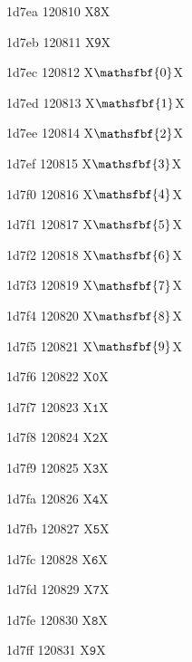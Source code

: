 \documentclass[11pt]{article}
\begin{document}
1d7ea 120810 X{\ensuremath{\mathsf{8}}}X

1d7eb 120811 X{\ensuremath{\mathsf{9}}}X

1d7ec 120812 X{\ensuremath{\mathsfbf{0}}}X

1d7ed 120813 X{\ensuremath{\mathsfbf{1}}}X

1d7ee 120814 X{\ensuremath{\mathsfbf{2}}}X

1d7ef 120815 X{\ensuremath{\mathsfbf{3}}}X

1d7f0 120816 X{\ensuremath{\mathsfbf{4}}}X

1d7f1 120817 X{\ensuremath{\mathsfbf{5}}}X

1d7f2 120818 X{\ensuremath{\mathsfbf{6}}}X

1d7f3 120819 X{\ensuremath{\mathsfbf{7}}}X

1d7f4 120820 X{\ensuremath{\mathsfbf{8}}}X

1d7f5 120821 X{\ensuremath{\mathsfbf{9}}}X

1d7f6 120822 X{\ensuremath{\mathtt{0}}}X

1d7f7 120823 X{\ensuremath{\mathtt{1}}}X

1d7f8 120824 X{\ensuremath{\mathtt{2}}}X

1d7f9 120825 X{\ensuremath{\mathtt{3}}}X

1d7fa 120826 X{\ensuremath{\mathtt{4}}}X

1d7fb 120827 X{\ensuremath{\mathtt{5}}}X

1d7fc 120828 X{\ensuremath{\mathtt{6}}}X

1d7fd 120829 X{\ensuremath{\mathtt{7}}}X

1d7fe 120830 X{\ensuremath{\mathtt{8}}}X

1d7ff 120831 X{\ensuremath{\mathtt{9}}}X
\end{document}
